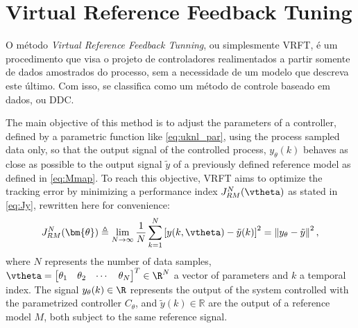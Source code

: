 


\chapter{Virtual Reference Feedback Tuning}\label{cap:VRFT}
\vspace{-1cm}


O método \emph{Virtual Reference Feedback Tunning}, ou simplesmente VRFT, é um procedimento que visa o projeto de controladores realimentados a partir somente de dados amostrados do processo, sem a necessidade de um modelo que descreva este último. Com isso, se classifica como um método de controle baseado em dados, ou DDC.

The main objective of this method is to adjust the parameters of a controller, defined by a parametric function like \eqref{eq:uknl_par}, using the process sampled data only, so that the output signal of the controlled process, $y_\theta(k)$ behaves as close as possible to the output signal $\tilde{y}$ of a previously defined reference model as defined in \eqref{eq:Mmap}.
To reach this objective, VRFT aims to optimize the tracking error by minimizing a performance index $J_{RM}^N(\vtheta)$ as stated in \eqref{eq:Jy}, rewritten here for convenience:
\begin{equation}
   J_{RM}^N(\bm{\theta}) \triangleq \lim_{N \to \infty}  \frac{1}{N} \sum_{k=1}^N \left[y(k,\vtheta) - \tilde{y}(k)\right]^2 = 
    \left\lVert y_\theta - \tilde{y} \right\lVert^{2}
   \label{eq:Jy},
\end{equation}
where $N$ represents the number of data samples, $\vtheta = \begin{bmatrix} \theta_1 & \theta_2 & \cdots & \theta_N \end{bmatrix}^T \in \R^N$ a vector of parameters and $k$ a temporal index. The signal $y_\theta(k) \in \R $ represents the output of the  system controlled with the parametrized controller $C_\theta$, and $\tilde{y}(k) \in \mathbb{R}$ are the output of a reference model $M$, both subject to the same reference signal.

